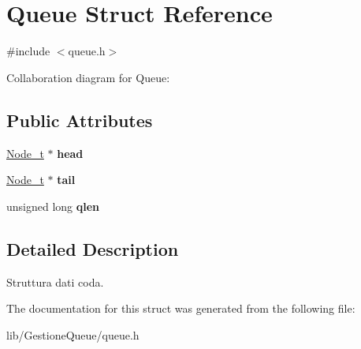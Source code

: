 \hypertarget{structQueue}{}\section{Queue Struct Reference}
\label{structQueue}


{\ttfamily \#include $<$queue.\+h$>$}



Collaboration diagram for Queue\+:
\subsection*{Public Attributes}
\begin{DoxyCompactItemize}
\item 
\mbox{\label{structQueue_a69a90bbfb03e94ee625d0ee1cb34f939}} 
\hyperlink{structNode}{Node\+\_\+t} $\ast$ {\bfseries head}
\item 
\mbox{\label{structQueue_a9c3bdf698b31580c5b16d86bcff29ff6}} 
\hyperlink{structNode}{Node\+\_\+t} $\ast$ {\bfseries tail}
\item 
\mbox{\label{structQueue_ad70e8c38202f78aa2ab1df797dc2efea}} 
unsigned long {\bfseries qlen}
\end{DoxyCompactItemize}


\subsection{Detailed Description}
Struttura dati coda. 

The documentation for this struct was generated from the following file\+:\begin{DoxyCompactItemize}
\item 
lib/\+Gestione\+Queue/queue.\+h\end{DoxyCompactItemize}
